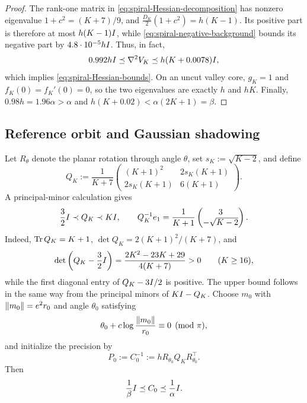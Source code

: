 \begin{proof}
The rank-one matrix in \eqref{eq:spiral-Hessian-decomposition} has nonzero eigenvalue
$1+c^2=(K+7)/9$, and
$\tfrac{D_K}{2}(1+c^2)=h(K-1)$.  Its positive part is therefore at most
$h(K-1)I$, while \eqref{eq:spiral-negative-background} bounds its negative part by
$4.8\cdot10^{-5}hI$.  Thus, in fact,
\[
 0.992hI\preceq\nabla^2V_K
 \preceq h(K+0.0078)I,
\]
which implies \eqref{eq:spiral-Hessian-bounds}.  On an uncut valley core,
$g_K=1$ and $f_K(0)=f_K'(0)=0$, so the two eigenvalues are exactly $h$ and $hK$.
Finally, $0.98h=1.96\alpha>\alpha$ and
$h(K+0.02)<\alpha(2K+1)=\beta$.
\end{proof}

\subsection{Reference orbit and Gaussian shadowing}

Let $R_\theta$ denote the planar rotation through angle $\theta$, set
$s_K:=\sqrt{K-2}$, and define
\begin{equation}
\label{eq:QK}
    Q_K
    :=\frac1{K+7}
      \begin{pmatrix}
        (K+1)^2 & 2s_K(K+1)\\
        2s_K(K+1) & 6(K+1)
      \end{pmatrix}.
\end{equation}
A principal-minor calculation gives
\begin{equation}
\label{eq:QK-band}
    \frac32I\prec Q_K\prec KI,
    \qquad
    Q_K^{-1}e_1
    =\frac1{K+1}\begin{pmatrix}3\\-\sqrt{K-2}\end{pmatrix}.
\end{equation}
Indeed, $\operatorname{Tr} Q_K=K+1$, $\det Q_K=2(K+1)^2/(K+7)$, and
\[
 \det\left(Q_K-\frac32I\right)
 =\frac{2K^2-23K+29}{4(K+7)}>0
 \qquad(K\geq16),
\]
while the first diagonal entry of $Q_K-3I/2$ is positive.  The upper bound follows in the
same way from the principal minors of $KI-Q_K$.
Choose $m_0$ with $\left\lVert m_0\right\rVert=e^2r_0$ and angle $\theta_0$ satisfying
\begin{equation}
\label{eq:valley-phase-init}
    \theta_0+c\log\frac{\left\lVert m_0\right\rVert}{r_0}\equiv0\pmod\pi,
\end{equation}
and initialize the precision by
\begin{equation}
\label{eq:spiral-P0}
    P_0:=C_0^{-1}:=hR_{\theta_0}Q_KR_{\theta_0}^\top.
\end{equation}
Then
\begin{equation}
\label{eq:spiral-C0-band}
    \frac1\beta I\preceq C_0\preceq\frac1\alpha I.
\end{equation}

